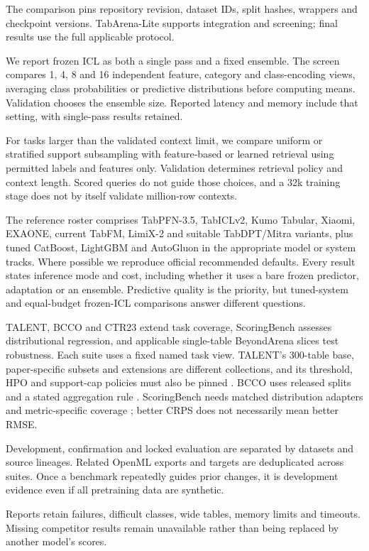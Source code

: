 \documentclass[11pt]{article}
\begin{document}
The comparison pins repository revision, dataset IDs, split hashes, wrappers and checkpoint versions. TabArena-Lite supports integration and screening; final results use the full applicable protocol.

We report frozen ICL as both a single pass and a fixed ensemble. The screen compares 1, 4, 8 and 16 independent feature, category and class-encoding views, averaging class probabilities or predictive distributions before computing means. Validation chooses the ensemble size. Reported latency and memory include that setting, with single-pass results retained.

For tasks larger than the validated context limit, we compare uniform or stratified support subsampling with feature-based or learned retrieval using permitted labels and features only. Validation determines retrieval policy and context length. Scored queries do not guide those choices, and a 32k training stage does not by itself validate million-row contexts.

The reference roster comprises TabPFN-3.5, TabICLv2, Kumo Tabular, Xiaomi, EXAONE, current TabFM, LimiX-2 and suitable TabDPT/Mitra variants, plus tuned CatBoost, LightGBM and AutoGluon in the appropriate model or system tracks. Where possible we reproduce official recommended defaults. Every result states inference mode and cost, including whether it uses a bare frozen predictor, adaptation or an ensemble. Predictive quality is the priority, but tuned-system and equal-budget frozen-ICL comparisons answer different questions.

TALENT, BCCO and CTR23 extend task coverage, ScoringBench assesses distributional regression, and applicable single-table BeyondArena slices test robustness. Each suite uses a fixed named task view. TALENT's 300-table base, paper-specific subsets and extensions are different collections, and its threshold, HPO and support-cap policies must also be pinned \cite{talent-code}. BCCO uses released splits and a stated aggregation rule \cite{bcco-code}. ScoringBench needs matched distribution adapters and metric-specific coverage \cite{scoringbench-code}; better CRPS does not necessarily mean better RMSE.

Development, confirmation and locked evaluation are separated by datasets and source lineages. Related OpenML exports and targets are deduplicated across suites. Once a benchmark repeatedly guides prior changes, it is development evidence even if all pretraining data are synthetic.

Reports retain failures, difficult classes, wide tables, memory limits and timeouts. Missing competitor results remain unavailable rather than being replaced by another model's scores.
\end{document}
